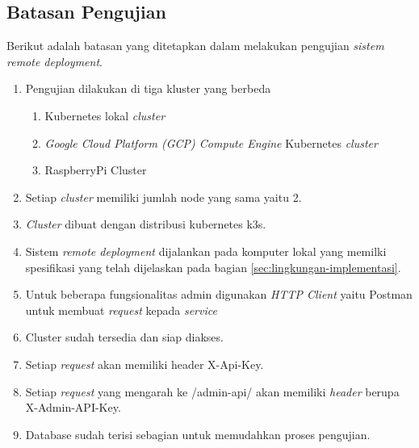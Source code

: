 \subsection{Batasan Pengujian}
\label{subsec:batasan-pengujian}
Berikut adalah batasan yang ditetapkan dalam melakukan pengujian \textit{sistem remote deployment}.

\begin{enumerate}
  \item Pengujian dilakukan di tiga kluster yang berbeda
        \begin{enumerate}
          \item Kubernetes lokal \textit{cluster}
          \item \textit{Google Cloud Platform (GCP) Compute Engine} Kubernetes \textit{cluster}
          \item RaspberryPi Cluster
        \end{enumerate}
  \item Setiap \textit{cluster} memiliki jumlah node yang sama yaitu 2.
  \item \textit{Cluster} dibuat dengan distribusi kubernetes k3s.
  \item Sistem \textit{remote deployment} dijalankan pada komputer lokal yang memilki spesifikasi yang telah dijelaskan pada bagian \ref{sec:lingkungan-implementasi}.
  \item Untuk beberapa fungsionalitas admin digunakan \textit{HTTP Client} yaitu Postman untuk membuat \textit{request} kepada \textit{service}
  \item Cluster sudah tersedia dan siap diakses.
  \item Setiap \textit{request} akan memiliki header X-Api-Key.
  \item Setiap \textit{request} yang mengarah ke /admin-api/ akan memiliki \textit{header} berupa X-Admin-API-Key.
  \item Database sudah terisi sebagian untuk memudahkan proses pengujian.
\end{enumerate}